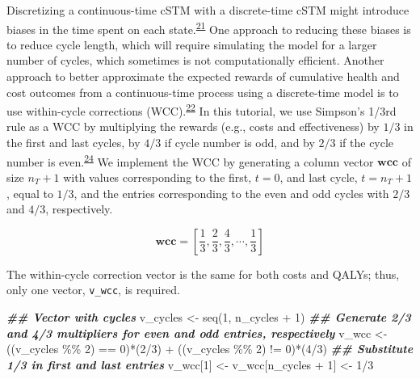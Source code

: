 \documentclass[
]{article}
\newenvironment{Shaded}{\begin{snugshade}}{\end{snugshade}}
\newcommand{\DecValTok}[1]{\textcolor[rgb]{0.00,0.00,0.81}{#1}}
\newcommand{\DocumentationTok}[1]{\textcolor[rgb]{0.56,0.35,0.01}{\textbf{\textit{#1}}}}
\newcommand{\FunctionTok}[1]{\textcolor[rgb]{0.00,0.00,0.00}{#1}}
\newcommand{\NormalTok}[1]{#1}
\newcommand{\OtherTok}[1]{\textcolor[rgb]{0.56,0.35,0.01}{#1}}
\newcommand{\SpecialCharTok}[1]{\textcolor[rgb]{0.00,0.00,0.00}{#1}}
\begin{document}
Discretizing a continuous-time cSTM with a discrete-time cSTM might introduce biases in the time spent on each state.\textsuperscript{\protect\hyperlink{ref-VanRosmalen2013}{21}} One approach to reducing these biases is to reduce cycle length, which will require simulating the model for a larger number of cycles, which sometimes is not computationally efficient. Another approach to better approximate the expected rewards of cumulative health and cost outcomes from a continuous-time process using a discrete-time model is to use within-cycle corrections (WCC).\textsuperscript{\protect\hyperlink{ref-Hunink2014}{22}} In this tutorial, we use Simpson's 1/3rd rule as a WCC by multiplying the rewards (e.g., costs and effectiveness) by \(1/3\) in the first and last cycles, by \(4/3\) if cycle number is odd, and by \(2/3\) if the cycle number is even.\textsuperscript{\protect\hyperlink{ref-Elbasha2016a}{24}} We implement the WCC by generating a column vector \(\mathbf{wcc}\) of size \(n_T+1\) with values corresponding to the first, \(t=0\), and last cycle, \(t= n_T + 1\), equal to \(1/3\), and the entries corresponding to the even and odd cycles with \(2/3\) and \(4/3\), respectively.

\[
  \mathbf{wcc} = \left[\frac{1}{3}, \frac{2}{3}, \frac{4}{3}, \cdots, \frac{1}{3}\right]
\]

The within-cycle correction vector is the same for both costs and QALYs; thus, only one vector, \texttt{v\_wcc}, is required.

\begin{Shaded}
\begin{Highlighting}[]
\DocumentationTok{\#\# Vector with cycles}
\NormalTok{v\_cycles }\OtherTok{\textless{}{-}} \FunctionTok{seq}\NormalTok{(}\DecValTok{1}\NormalTok{, n\_cycles }\SpecialCharTok{+} \DecValTok{1}\NormalTok{)}
\DocumentationTok{\#\# Generate 2/3 and 4/3 multipliers for even and odd entries, respectively}
\NormalTok{v\_wcc }\OtherTok{\textless{}{-}}\NormalTok{ ((v\_cycles }\SpecialCharTok{\%\%} \DecValTok{2}\NormalTok{) }\SpecialCharTok{==} \DecValTok{0}\NormalTok{)}\SpecialCharTok{*}\NormalTok{(}\DecValTok{2}\SpecialCharTok{/}\DecValTok{3}\NormalTok{) }\SpecialCharTok{+}\NormalTok{ ((v\_cycles }\SpecialCharTok{\%\%} \DecValTok{2}\NormalTok{) }\SpecialCharTok{!=} \DecValTok{0}\NormalTok{)}\SpecialCharTok{*}\NormalTok{(}\DecValTok{4}\SpecialCharTok{/}\DecValTok{3}\NormalTok{)}
\DocumentationTok{\#\# Substitute 1/3 in first and last entries}
\NormalTok{v\_wcc[}\DecValTok{1}\NormalTok{] }\OtherTok{\textless{}{-}}\NormalTok{ v\_wcc[n\_cycles }\SpecialCharTok{+} \DecValTok{1}\NormalTok{] }\OtherTok{\textless{}{-}} \DecValTok{1}\SpecialCharTok{/}\DecValTok{3}
\end{Highlighting}
\end{Shaded}
\end{document}
